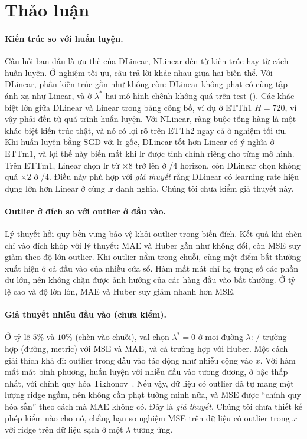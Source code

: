 \section{Thảo luận}
\label{sec:discussion}

\paragraph{Kiến trúc so với huấn luyện.} Câu hỏi ban đầu là ưu thế của DLinear, NLinear đến từ kiến trúc hay từ cách huấn luyện. Ở nghiệm tối ưu, câu trả lời khác nhau giữa hai biến thể. Với DLinear, phần kiến trúc gần như không còn: DLinear không phạt có cùng tập ánh xạ như Linear, và ở $\lambda^*$ hai mô hình chênh không quá \nmBThreeDLinMinusLinAllAbsMax{} trên test (). Các khác biệt lớn giữa DLinear và Linear trong bảng công bố, ví dụ \nmCThreeETThOneHSevenTwoZeroPubD{} ở ETTh1 $H = 720$, vì vậy phải đến từ quá trình huấn luyện. Với NLinear, ràng buộc tổng hàng là một khác biệt kiến trúc thật, và nó có lợi rõ trên ETTh2 ngay cả ở nghiệm tối ưu. Khi huấn luyện bằng SGD với lr gốc, DLinear tốt hơn Linear có ý nghĩa ở ETTm1, và lợi thế này biến mất khi lr được tinh chỉnh riêng cho từng mô hình. Trên ETTm1, Linear chọn lr từ $\times 8$ trở lên ở \nmTunedETTmOneLinearChoseGeEightCount/4 horizon, còn DLinear chọn không quá $\times 2$ ở \nmTunedETTmOneDLinearChoseLeTwoCount/4. Điều này phù hợp với \emph{giả thuyết} rằng DLinear có learning rate hiệu dụng lớn hơn Linear ở cùng lr danh nghĩa. Chúng tôi chưa kiểm giả thuyết này.

\paragraph{Outlier ở đích so với outlier ở đầu vào.} Lý thuyết hồi quy bền vững bảo vệ khỏi outlier trong biến đích. Kết quả khi chèn chỉ vào đích khớp với lý thuyết: MAE và Huber gần như không đổi, còn MSE suy giảm theo độ lớn outlier. Khi outlier nằm trong chuỗi, cùng một điểm bất thường xuất hiện ở cả đầu vào của nhiều cửa sổ. Hàm mất mát chỉ hạ trọng số các phần dư lớn, nên không chặn được ảnh hưởng của các hàng đầu vào bất thường. Ở tỷ lệ cao và độ lớn lớn, MAE và Huber suy giảm nhanh hơn MSE.

\paragraph{Giả thuyết nhiễu đầu vào (chưa kiểm).} Ở tỷ lệ $5\%$ và $10\%$ (chèn vào chuỗi), val chọn $\lambda^* = 0$ ở mọi đường $\lambda$: \nmOutLamZeroMseMaeCount/\nmOutLamZeroMseMaeTotalCount{} trường hợp (đường, metric) với MSE và MAE, và cả \nmOutLamZeroCount{} trường hợp với Huber. Một cách giải thích khả dĩ: outlier trong đầu vào tác động như nhiễu cộng vào $x$. Với hàm mất mát bình phương, huấn luyện với nhiễu đầu vào tương đương, ở bậc thấp nhất, với chính quy hóa Tikhonov~\cite{bishop1995training}. Nếu vậy, dữ liệu có outlier đã tự mang một lượng ridge ngầm, nên không cần phạt tường minh nữa, và MSE được ``chính quy hóa sẵn'' theo cách mà MAE không có. Đây là \emph{giả thuyết}. Chúng tôi chưa thiết kế phép kiểm nào cho nó, chẳng hạn so nghiệm MSE trên dữ liệu có outlier trong $x$ với ridge trên dữ liệu sạch ở một $\lambda$ tương ứng.

